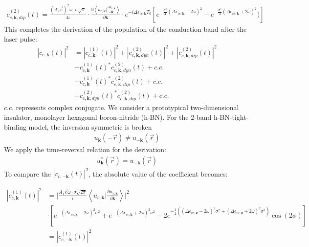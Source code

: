 \begin{equation}
\begin{aligned}
    c^{(2)}_{c,\mathbf k,dip}(t)=\frac{(A_2 \vec e)^2 \omega  \cdot \sigma \sqrt{\pi}}{4i} \cdot \frac{\partial{\left \langle u_{c,\mathbf k}\Big |\frac{\partial u_{v,\mathbf k}}{\partial \mathbf k} \right \rangle}}{\partial {\mathbf k}} \cdot e^{-i\Delta \epsilon_{vc,\mathbf k} T_0} [e^{-\frac{\sigma^2}{4} (\Delta \epsilon_{vc,\mathbf k}-2\omega )^2}-e^{-\frac{\sigma^2}{4} (\Delta \epsilon_{vc,\mathbf k}+2\omega )^2})]
\end{aligned}
\end{equation}
This completes the derivation of the population of the conduction band after the laser pulse:
\begin{equation}
\begin{aligned}
|c_{c,\mathbf k}(t)|^2&=|c^{(1)}_{c,\mathbf k}(t)|^2+|c^{(2)}_{c,\mathbf k,dyn}(t)|^2+|c^{(2)}_{c,\mathbf k,dip}(t)|^2\\
    &+ c^{(1)}_{c,\mathbf k}(t)^* c^{(2)}_{c,\mathbf k,dyn}(t) +c.c.\\
    &+c^{(1)}_{c,\mathbf k}(t)^* c^{(2)}_{c,\mathbf k,dip}(t)+c.c.\\
    &+c^{(2)}_{c,\mathbf k,dyn}(t)^* c^{(2)}_{c,\mathbf k,dip}(t)+c.c.
\end{aligned}
\end{equation}
$c.c.$ represents complex conjugate. We consider a prototypical two-dimensional insulator, monolayer hexagonal boron-nitride (\gls{h-BN}). For the 2-band \gls{h-BN}-tight-binding model, the inversion symmetric is broken
\begin{align}
u_{\mathbf k}(-\vec r)\neq u_{-\mathbf k}(\vec r)    
\end{align}
We apply the time-reversal relation for the derivation:
\begin{align}
u^*_{\mathbf k}(\vec r)= u_{-\mathbf k}(\vec r)   
\end{align}
To compare the $|c_{c,-\mathbf k}(t)|^2$, the absolute value of the coefficient becomes:

\begin{equation}
\begin{aligned}
  |c^{(1)}_{c,\mathbf k}(t)|^2 &=\lvert \frac{A_1 \vec e \omega  \cdot \sigma \sqrt{2\pi}}{i} \left \langle
  u_{c,\mathbf k}\Big |\frac{\partial u_{v,\mathbf k}}{\partial \mathbf k} \right \rangle \rvert^2\\ 
 & \cdot [e^{-(\Delta \epsilon_{vc,\mathbf k} - 2\omega )^2 \sigma^2}
    +e^{-(\Delta \epsilon_{vc,\mathbf k} + 2\omega )^2 \sigma^2}
    -2e^{-\frac{1}{2}((\Delta \epsilon_{vc,\mathbf k} - 2\omega )^2 \sigma^2
    +(\Delta \epsilon_{vc,\mathbf k} + 2\omega )^2 \sigma^2)}\cos(2\phi)]\\
    &=  |c^{(1)}_{c,-\mathbf k}(t)|^2
\end{aligned}
\end{equation}

